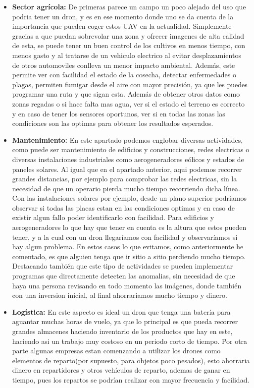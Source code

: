 \documentclass{article}
\begin{document}
\begin{itemize}
	\item \textbf{Sector agr\'icola:} De primeras parece un campo un poco alejado del uso que podria tener un dron, y es en ese momento donde uno se da cuenta de la importancia que pueden coger estos UAV en la actualidad. Simplemente gracias a que puedan sobrevolar una zona y ofrecer imagenes de alta calidad de esta, se puede tener un buen control de los cultivos en menos tiempo, con menos gasto y al tratarse de un vehiculo electrico al evitar desplazamientos de otros automoviles conlleva un menor impacto ambiental. Adem\'as, este permite ver con facilidad el estado de la cosecha, detectar enfermedades o plagas, permiten fumigar desde el aire con mayor precisi\'on, ya que les puedes programar una ruta y que sigan esta. Adem\'as de obtener otros datos como zonas regadas o si hace falta mas agua, ver si el estado el terreno es correcto y en caso de tener los sensores oportunos, ver si en todas las zonas las condiciones son las optimas para obtener los resultados esperados.  
	
\item \textbf{Mantenimiento:} En este apartado podemos englobar diversas actividades, como puede ser mantenimiento de edificios y construcciones, redes electricas o diversas instalaciones industriales como aerogeneradores e\'olicos y estados de paneles solares. Al igual que en el apartado anterior, aqui podemos recorrer grandes distancias, por ejemplo para comprobar las redes electricas, sin la necesidad de que un operario pierda mucho tiempo recorriendo dicha l\'inea. Con las instalaciones solares por ejemplo, desde un plano superior podriamos observar si todas las placas estan en las condiciones optimas y en caso de existir algun fallo poder identificarlo con facilidad. Para edificios y aerogeneradores lo que hay que tener en cuenta es la altura que estos pueden tener, y a la cual con un dron llegar\'iamos con facilidad y observar\'iamos si hay algun problema. En estos casos lo que evitamos, como anteriormente he comentado, es que alguien tenga que ir sitio a sitio perdiendo mucho tiempo. Destacando tambi\'en que este tipo de actividades se pueden implementar programas que directamente detecten las anomalias, sin necesidad de que haya una persona revisando en todo momento las im\'agenes, donde tambi\'en con una inversion inicial, al final ahorrariamos mucho tiempo y dinero. 
	
\item \textbf{Log\'istica:} En este aspecto es ideal un dron que tenga una bater\'ia para aguantar muchas horas de vuelo, ya que lo principal es que pueda recorrer grandes almacenes haciendo inventario de los productos que hay en este, haciendo asi un trabajo muy costoso en un periodo corto de tiempo. 
\hspace{1 cm} Por otra parte algunas empresas estan comenzando a utilizar los drones como elementos de reparto(por supuesto, para objetos poco pesados), esto ahorraria dinero en repartidores y otros veh\'iculos de reparto, ademas de ganar en tiempo, pues los repartos se podr\'ian realizar con mayor frecuencia y facilidad.

\end{itemize}
\end{document}
